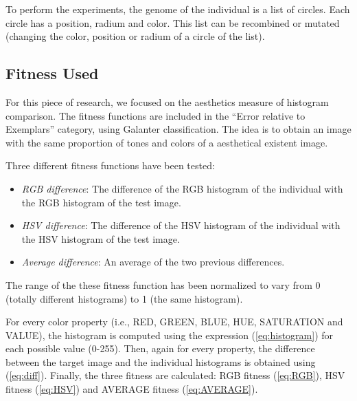 To perform the experiments, the genome of the individual is a list of circles. Each circle has a position, radium and color. This list can be recombined or mutated (changing the color, position or radium of a circle of the list).

\subsection{Fitness Used}
For this piece of research, we focused on the aesthetics measure of histogram comparison. The fitness functions are included in the ``Error relative to Exemplars'' category, using Galanter \cite{galanter2012computational} classification. The idea is to obtain an image with the same proportion of tones and colors of a aesthetical existent image.

Three different fitness functions have been tested:
\begin{itemize}
\item {\em RGB difference}: The difference of the RGB histogram of the individual with the RGB histogram of the test image.
\item {\em HSV difference}: The difference of the HSV histogram of the individual with the HSV histogram of the test image.
\item {\em Average difference}: An average of the two previous differences.
\end{itemize}

The range of the these fitness function has been normalized to vary from 0 (totally different histograms) to 1 (the same histogram).

For every color property (i.e., RED, GREEN, BLUE, HUE, SATURATION and VALUE), the histogram is computed using the expression (\ref{eq:histogram}) for each possible value (0-255). Then, again for every property, the difference between the target image and the individual histograms is obtained using (\ref{eq:diff}). Finally, the three fitness are calculated: RGB fitness (\ref{eq:RGB}), HSV fitness (\ref{eq:HSV}) and AVERAGE fitness (\ref{eq:AVERAGE}).

